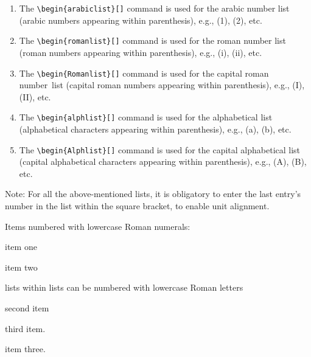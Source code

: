 \begin{enumerate}
\item The \verb|\begin{arabiclist}[]| command is used for the arabic
number list (arabic numbers appearing within parenthesis), e.g., (1),
(2), etc.

\smallskip

\item The \verb|\begin{romanlist}[]| command is used for the roman
number list (roman numbers appearing within parenthesis), e.g., (i),
(ii), etc.

\smallskip

\item The \verb|\begin{Romanlist}[]| command is used for the capital roman
\hbox{number list} (capital roman numbers appearing within parenthesis),
e.g., (I), (II), etc.

\smallskip

\item The \verb|\begin{alphlist}[]| command is used for the alphabetical
list (alphabetical characters appearing within parenthesis),
e.g., (a), (b), etc.

\smallskip

\item The \verb|\begin{Alphlist}[]| command is used for the capital
alphabetical list (capital alphabetical characters appearing within
parenthesis), e.g., (A), (B), etc.
\end{enumerate}

Note: For all the above-mentioned lists, it is obligatory to enter the last
entry's number in the list within the square bracket, to enable unit
alignment.

Items numbered with lowercase Roman numerals:

\begin{romanlist}[(iii)]
\item item one
\item item two
    \begin{alphlist}[(a)]
    \item lists within lists can be numbered with lowercase Roman letters
    \item second item
    \item third item.
    \end{alphlist}
\item item three.
\end{romanlist}

